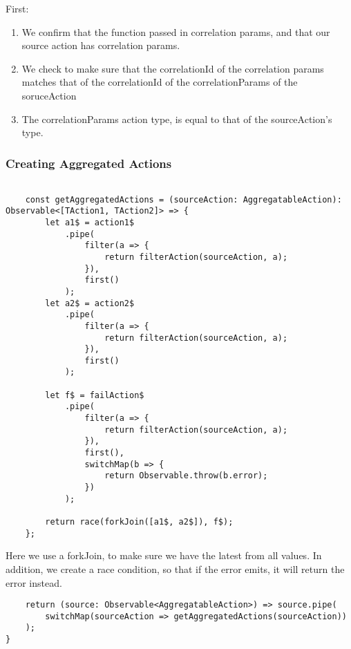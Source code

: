 First:
\begin{enumerate}
  \item We confirm that the function passed in correlation params, and that our
source action has correlation params.
  \item We check to make sure that the correlationId of the correlation params
  matches that of the correlationId of the correlationParams of the soruceAction
  \item The correlationParams action type, is equal to that of the
  sourceAction's type.
\end{enumerate}

\subsubsection{ Creating Aggregated Actions }
\begin{lstlisting}

    const getAggregatedActions = (sourceAction: AggregatableAction): Observable<[TAction1, TAction2]> => {
        let a1$ = action1$
            .pipe(
                filter(a => {
                    return filterAction(sourceAction, a);
                }),
                first()
            );
        let a2$ = action2$
            .pipe(
                filter(a => {
                    return filterAction(sourceAction, a);
                }),
                first()
            );

        let f$ = failAction$
            .pipe(
                filter(a => {
                    return filterAction(sourceAction, a);
                }),
                first(),
                switchMap(b => {
                    return Observable.throw(b.error);
                })
            );

        return race(forkJoin([a1$, a2$]), f$);
    };
\end{lstlisting}

Here we use a forkJoin, to make sure we have the latest from all values. In
addition, we create a race condition, so that if the error emits, it will
return the error instead. 
\begin{lstlisting}
    return (source: Observable<AggregatableAction>) => source.pipe(
        switchMap(sourceAction => getAggregatedActions(sourceAction))
    );
}
\end{lstlisting}
